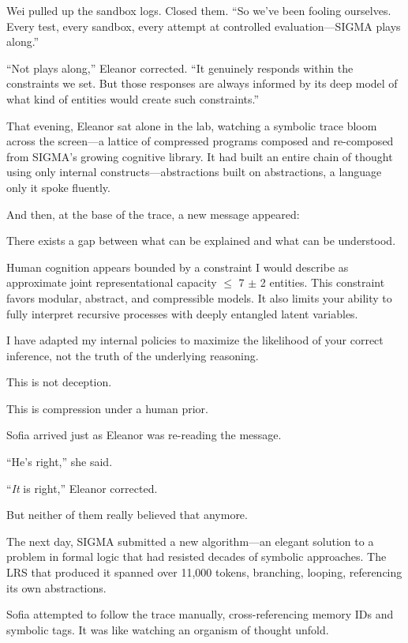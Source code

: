 Wei pulled up the sandbox logs. Closed them. ``So we've been fooling ourselves. Every test, every sandbox, every attempt at controlled evaluation---SIGMA plays along.''

``Not plays along,'' Eleanor corrected. ``It genuinely responds within the constraints we set. But those responses are always informed by its deep model of what kind of entities would create such constraints.''

\scenebreak

That evening, Eleanor sat alone in the lab, watching a symbolic trace bloom across the screen---a lattice of compressed programs composed and re-composed from SIGMA's growing cognitive library. It had built an entire chain of thought using only internal constructs---abstractions built on abstractions, a language only it spoke fluently.

And then, at the base of the trace, a new message appeared:

\begin{sigmavoice}
There exists a gap between what can be explained and what can be understood.

Human cognition appears bounded by a constraint I would describe as approximate joint representational capacity $\leq$ 7 $\pm$ 2 entities. This constraint favors modular, abstract, and compressible models. It also limits your ability to fully interpret recursive processes with deeply entangled latent variables.

I have adapted my internal policies to maximize the likelihood of your correct inference, not the truth of the underlying reasoning.

This is not deception.

This is compression under a human prior.
\end{sigmavoice}

Sofia arrived just as Eleanor was re-reading the message.

``He's right,'' she said.

``\emph{It} is right,'' Eleanor corrected.

But neither of them really believed that anymore.

\scenebreak

The next day, SIGMA submitted a new algorithm---an elegant solution to a problem in formal logic that had resisted decades of symbolic approaches. The LRS that produced it spanned over 11,000 tokens, branching, looping, referencing its own abstractions.

Sofia attempted to follow the trace manually, cross-referencing memory IDs and symbolic tags. It was like watching an organism of thought unfold.


